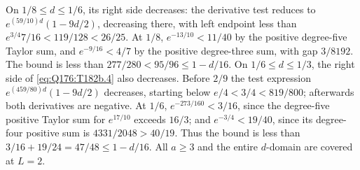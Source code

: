 On $1/8\le\allowbreak  d\le\allowbreak 1/6$, its right side decreases: the derivative test
reduces to $e^{(59/10)d}(1-9d/2)$, decreasing there, with left endpoint
less than $e^{3/4}7/16<\allowbreak 119/128<\allowbreak 26/25$.
At $1/8$, $e^{-13/10}<\allowbreak 11/40$ by the positive degree-five Taylor sum,
and $e^{-9/16}<\allowbreak 4/7$ by the positive degree-three sum, with gap $3/8192$.
The bound is less than $277/280<\allowbreak 95/96\le\allowbreak 1-d/16$.
On $1/6\le\allowbreak  d\le\allowbreak 1/3$, the right side of \eqref{eq:Q176:T182b.4}
also decreases. Before $2/9$ the test expression
$e^{(459/80)d}(1-9d/2)$ decreases, starting below
$e/4<\allowbreak 3/4<\allowbreak 819/800$; afterwards both derivatives are negative.
At $1/6$, $e^{-273/160}<\allowbreak 3/16$, since the degree-five positive Taylor
sum for $e^{17/10}$ exceeds $16/3$;
and $e^{-3/4}<\allowbreak 19/40$, since its degree-four positive sum is
$4331/2048>\allowbreak 40/19$.
Thus the bound is less than $3/16+19/24=\allowbreak 47/48\le\allowbreak 1-d/16$.
All $a\ge\allowbreak 3$ and the entire $d$-domain are covered at $L=\allowbreak 2$.

